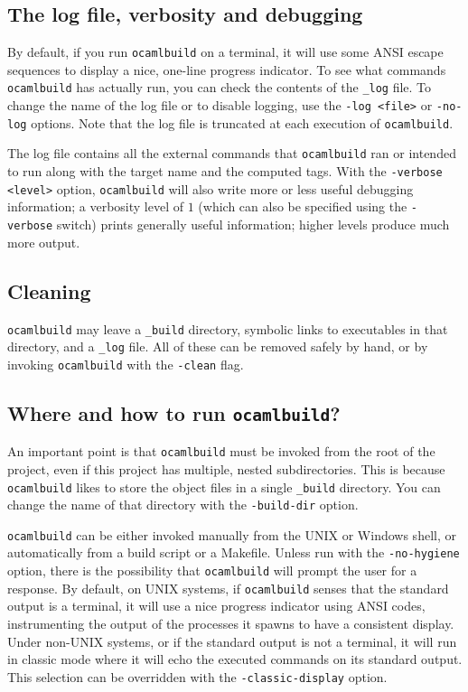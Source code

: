 \documentclass[9pt]{article}
\newcommand{\ocb}{\texttt{ocamlbuild}\xspace}
\begin{document}
\subsection{The log file, verbosity and debugging}
By default, if you run \ocb on a terminal, it will use some ANSI escape sequences
to display a nice, one-line progress indicator.  To see what commands \ocb has actually run,
you can check the contents of the \texttt{\_log} file.  To change the name of the
log file or to disable logging, use the \texttt{-log <file>} or \texttt{-no-log} options.
Note that the log file is truncated at each execution of \ocb.

The log file contains all the external commands that \ocb ran or intended to
run along with the target name and the computed tags.  With the
\texttt{-verbose <level>} option, \ocb will also write more or less useful
debugging information;  a verbosity level of $1$ (which can also be specified
using the \texttt{-verbose} switch) prints generally useful information; higher
levels produce much more output.
\subsection{Cleaning}
\ocb may leave a \texttt{\_build} directory, symbolic links to executables in
that directory, and a \texttt{\_log} file.  All of these can be removed safely
by hand, or by invoking \ocb with the \texttt{-clean} flag.
\subsection{Where and how to run \ocb ?}
An important point is that \ocb must be invoked from the root of the project,
even if this project has multiple, nested subdirectories.  This is because \ocb
likes to store the object files in a single \texttt{\_build} directory.  You
can change the name of that directory with the \texttt{-build-dir} option.

\ocb can be either invoked manually from the UNIX or Windows shell, or
automatically from a build script or a Makefile.  Unless run with the
\texttt{-no-hygiene} option, there is the possibility that \ocb will prompt the
user for a response.  By default, on UNIX systems, if \ocb senses that the
standard output is a terminal, it will use a nice progress indicator using ANSI
codes, instrumenting the output of the processes it spawns to have a consistent
display.  Under non-UNIX systems, or if the standard output is not a terminal,
it will run in classic mode where it will echo the executed commands on its
standard output.  This selection can be overridden with the \texttt{-classic-display} option.
\end{document}
